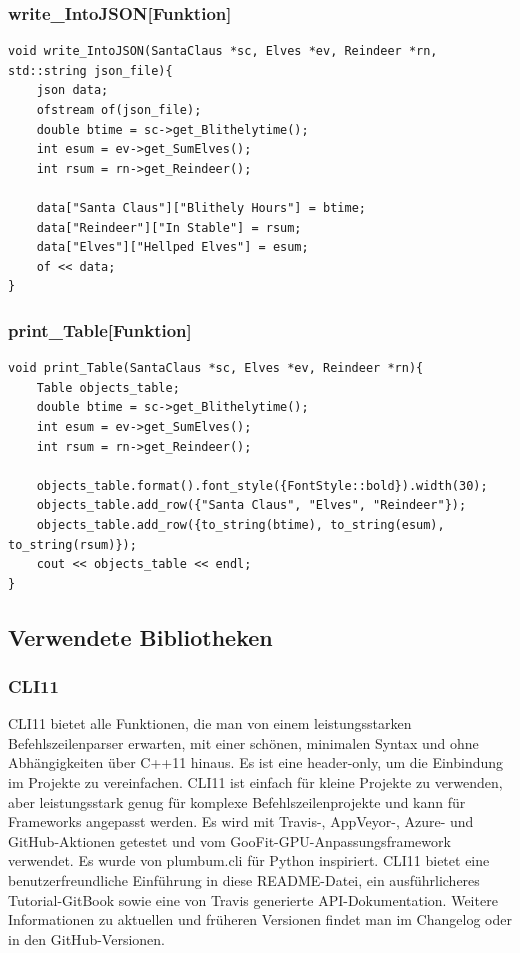 \documentclass[a4paper,12pt]{article}
\begin{document}
\subsubsection{write\_IntoJSON[Funktion]}
\begin{verbatim}
void write_IntoJSON(SantaClaus *sc, Elves *ev, Reindeer *rn, std::string json_file){
    json data;
    ofstream of(json_file);
    double btime = sc->get_Blithelytime();
    int esum = ev->get_SumElves();
    int rsum = rn->get_Reindeer();

    data["Santa Claus"]["Blithely Hours"] = btime;
    data["Reindeer"]["In Stable"] = rsum;
    data["Elves"]["Hellped Elves"] = esum;
    of << data;
}
\end{verbatim}

\subsubsection{print\_Table[Funktion]}
\begin{verbatim}
void print_Table(SantaClaus *sc, Elves *ev, Reindeer *rn){
    Table objects_table;
    double btime = sc->get_Blithelytime();
    int esum = ev->get_SumElves();
    int rsum = rn->get_Reindeer();

    objects_table.format().font_style({FontStyle::bold}).width(30);
    objects_table.add_row({"Santa Claus", "Elves", "Reindeer"});
    objects_table.add_row({to_string(btime), to_string(esum), to_string(rsum)});
    cout << objects_table << endl;
}
\end{verbatim}


\subsection{Verwendete Bibliotheken}
\subsubsection{CLI11}
CLI11 bietet alle Funktionen, die man von einem leistungsstarken Befehlszeilenparser erwarten, mit einer schönen, minimalen Syntax und ohne 
Abhängigkeiten über C++11 hinaus. Es ist eine header-only, um die Einbindung im Projekte zu 
vereinfachen. CLI11 ist einfach für kleine Projekte zu verwenden, aber leistungsstark genug für komplexe Befehlszeilenprojekte und kann für Frameworks angepasst werden. 
Es wird mit Travis-, AppVeyor-, Azure- und GitHub-Aktionen getestet und vom GooFit-GPU-Anpassungsframework verwendet. 
Es wurde von plumbum.cli für Python inspiriert. CLI11 bietet eine benutzerfreundliche Einführung in diese README-Datei, ein ausführlicheres Tutorial-GitBook sowie eine von Travis generierte API-Dokumentation. 
Weitere Informationen zu aktuellen und früheren Versionen findet man im Changelog oder in den GitHub-Versionen.
\end{document}
